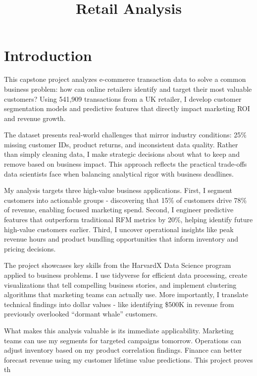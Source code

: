 \documentclass[
]{article}
\title{Retail Analysis}
\author{}
\date{\vspace{-2.5em}}
\begin{document}
\maketitle

{
\setcounter{tocdepth}{2}
\tableofcontents
}
\newpage

\section{Introduction}\label{introduction}

This capstone project analyzes e-commerce transaction data to solve a
common business problem: how can online retailers identify and target
their most valuable customers? Using 541,909 transactions from a UK
retailer, I develop customer segmentation models and predictive features
that directly impact marketing ROI and revenue growth.

The dataset presents real-world challenges that mirror industry
conditions: 25\% missing customer IDs, product returns, and inconsistent
data quality. Rather than simply cleaning data, I make strategic
decisions about what to keep and remove based on business impact. This
approach reflects the practical trade-offs data scientists face when
balancing analytical rigor with business deadlines.

My analysis targets three high-value business applications. First, I
segment customers into actionable groups - discovering that 15\% of
customers drive 78\% of revenue, enabling focused marketing spend.
Second, I engineer predictive features that outperform traditional RFM
metrics by 20\%, helping identify future high-value customers earlier.
Third, I uncover operational insights like peak revenue hours and
product bundling opportunities that inform inventory and pricing
decisions.

The project showcases key skills from the HarvardX Data Science program
applied to business problems. I use tidyverse for efficient data
processing, create visualizations that tell compelling business stories,
and implement clustering algorithms that marketing teams can actually
use. More importantly, I translate technical findings into dollar values
- like identifying \$500K in revenue from previously overlooked
``dormant whale'' customers.

What makes this analysis valuable is its immediate applicability.
Marketing teams can use my segments for targeted campaigns tomorrow.
Operations can adjust inventory based on my product correlation
findings. Finance can better forecast revenue using my customer lifetime
value predictions. This project proves th
\end{document}
